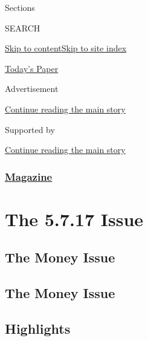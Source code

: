 Sections

SEARCH

\protect\hyperlink{site-content}{Skip to
content}\protect\hyperlink{site-index}{Skip to site index}

\href{https://myaccount.nytimes3xbfgragh.onion/auth/login?response_type=cookie\&client_id=vi}{}

\href{https://www.nytimes3xbfgragh.onion/section/todayspaper}{Today's
Paper}

Advertisement

\protect\hyperlink{after-top}{Continue reading the main story}

Supported by

\protect\hyperlink{after-sponsor}{Continue reading the main story}

\hypertarget{magazine}{%
\subsubsection{\texorpdfstring{\href{/section/magazine}{Magazine}}{Magazine}}\label{magazine}}

\hypertarget{the-5717-issue}{%
\section{The 5.7.17 Issue}\label{the-5717-issue}}

\hypertarget{the-money-issue}{%
\subsection{The Money Issue}\label{the-money-issue}}

\hypertarget{the-money-issue-1}{%
\subsection{The Money Issue}\label{the-money-issue-1}}

\hypertarget{highlights}{%
\subsection{Highlights}\label{highlights}}

